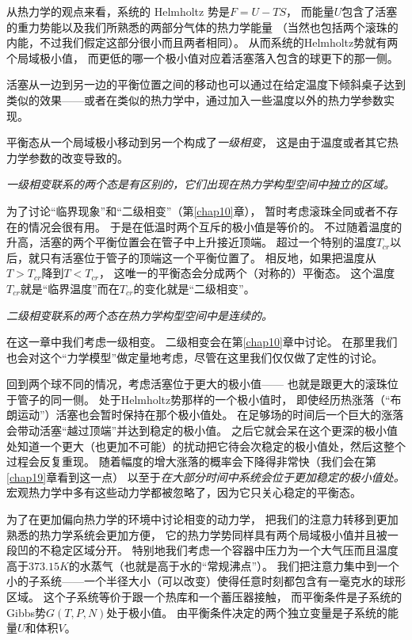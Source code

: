 从热力学的观点来看，系统的 Helmholtz 势是$F=U-TS$，
而能量$U$包含了活塞的重力势能以及我们所熟悉的两部分气体的热力学能量
（当然也包括两个滚珠的内能，不过我们假定这部分很小而且两者相同）。
从而系统的Helmholtz势就有两个局域极小值，
而更低的哪一个极小值对应着活塞落入包含的球更下的那一侧。

活塞从一边到另一边的平衡位置之间的移动也可以通过在给定温度下倾斜桌子达到类似的效果——或者在类似的热力学中，通过加入一些温度以外的热力学参数实现。

平衡态从一个局域极小移动到另一个构成了{\it 一级相变}，
这是由于温度或者其它热力学参数的改变导致的。

{\it 一级相变联系的两个态是有区别的，它们出现在热力学构型空间中独立的区域。}

为了讨论“临界现象”和“二级相变”（第\ref{chap10}章），
暂时考虑滚珠全同或者不存在的情况会很有用。
于是在低温时两个互斥的极小值是等价的。
不过随着温度的升高，活塞的两个平衡位置会在管子中上升接近顶端。
超过一个特别的温度$T_{cr}$以后，就只有活塞位于管子的顶端这一个平衡位置了。
相反地，如果把温度从$T>T_{cr}$降到$T<T_{cr}$，
这唯一的平衡态会分成两个（对称的）平衡态。
这个温度$T_{cr}$就是“临界温度”而在$T_{cr}$的变化就是“二级相变”。

{\it 二级相变联系的两个态在热力学构型空间中是连续的。}

在这一章中我们考虑一级相变。
二级相变会在第\ref{chap10}章中讨论。
在那里我们也会对这个“力学模型”做定量地考虑，尽管在这里我们仅仅做了定性的讨论。

回到两个球不同的情况，考虑活塞位于更大的极小值——
也就是跟更大的滚珠位于管子的同一侧。
处于Helmholtz势那样的一个极小值时，
即使经历热涨落（“布朗运动”）活塞也会暂时保持在那个极小值处。
在足够场的时间后一个巨大的涨落会带动活塞“越过顶端”并达到稳定的极小值。
之后它就会呆在这个更深的极小值处知道一个更大（也更加不可能）的扰动把它待会次稳定的极小值处，然后这整个过程会反复重现。
随着幅度的增大涨落的概率会下降得非常快（我们会在第\ref{chap19}章看到这一点）
以至于{\it 在大部分时间中系统会位于更加稳定的极小值处。}
宏观热力学中多有这些动力学都被忽略了，因为它只关心稳定的平衡态。

为了在更加偏向热力学的环境中讨论相变的动力学，
把我们的注意力转移到更加熟悉的热力学系统会更加方便，
它的热力学势同样具有两个局域极小值并且被一段凹的不稳定区域分开。
特别地我们考虑一个容器中压力为一个大气压而且温度高于$373.15K$的水蒸气（也就是高于水的“常规沸点”）。
我们把注意力集中到一个小的子系统——一个半径大小（可以改变）使得任意时刻都包含有一毫克水的球形区域。
这个子系统等价于跟一个热库和一个蓄压器接触，
而平衡条件是子系统的Gibbs势$G(T,P,N)$处于极小值。
由平衡条件决定的两个独立变量是子系统的能量$U$和体积$V$。

